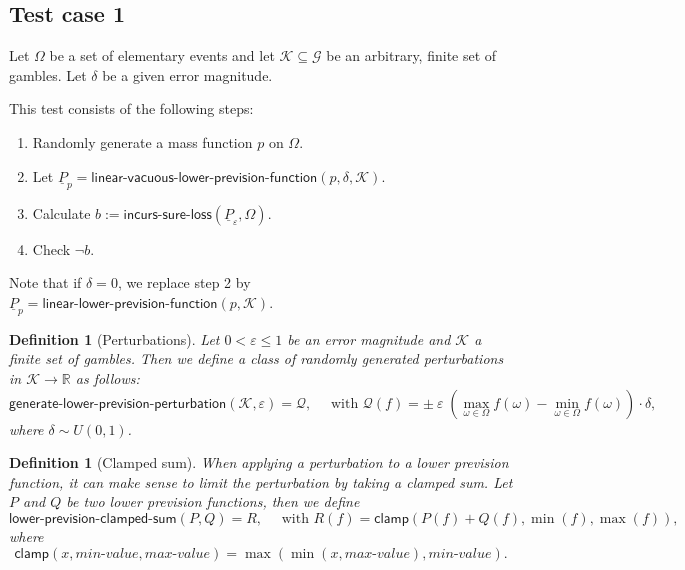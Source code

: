 \documentclass{article}
\theoremstyle{mytheorem}
\newtheorem{definition}[theorem]{Definition}
\newcommand{\func}[1]{\ensuremath{\textsf{#1}}} %
\newcommand{\var}[1]{\ensuremath{\textit{#1}}} %
\begin{document}
\subsection{Test case 1}
Let $\Omega$ be a set of elementary events and let $\mathcal{K} \subseteq \mathcal{G}$ be an arbitrary, finite set of gambles.  Let $\delta$ be a given error magnitude.


\vspace{0.5cm}
\noindent
This test consists of the following steps:
\begin{enumerate}
    \item Randomly generate a mass function $p$ on $\Omega$.
    \item Let $\underline{P}_p = \func{linear-vacuous-lower-prevision-function}(p, \delta, \mathcal{K})$.
    \item Calculate $b := \func{incurs-sure-loss}(\underline{P}_\varepsilon, \Omega)$.
    \item Check $\neg b$.
\end{enumerate}
Note that if $\delta=0$, we replace step 2 by $\underline{P}_p = \func{linear-lower-prevision-function}(p, \mathcal{K})$.

\begin{definition}[Perturbations] \label{def:perturbation}
Let $0 < \varepsilon \leq 1$ be an error magnitude and $\mathcal{K}$ a finite set of gambles. Then we define a class of randomly generated perturbations in $\mathcal{K} \rightarrow \mathbb{R}$ as follows:
\begin{equation} \label{eq:lower-prevision-perturbation}
  \func{generate-lower-prevision-perturbation}(\mathcal{K}, \varepsilon) = \mathcal{Q}, \quad \text{ with } \mathcal{Q}(f) = \pm ~ \varepsilon \; (\max_{\omega \in \Omega} f(\omega) - \min_{\omega \in \Omega} f(\omega)) \cdot \delta,
\end{equation}
where $\delta \sim U(0,1)$.
\end{definition}

\begin{definition}[Clamped sum]
When applying a perturbation to a lower prevision function, it can make sense to limit the perturbation by taking a clamped sum. Let $P$ and $Q$ be two lower prevision functions,
then we define
\begin{equation} \label{eq:lower-prevision-clamped-sum}
  \func{lower-prevision-clamped-sum}(P,Q) = R, \quad \text{ with } 
     R(f) = \func{clamp}(P(f) + Q(f), \min(f), \max(f)),
\end{equation}
where 
\[
\func{clamp}(x, \var{min-value}, \var{max-value}) = \max(\min(x, \var{max-value}), \var{min-value}).
\]
\end{definition}
\end{document}
